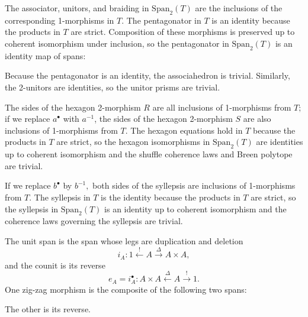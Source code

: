 \documentclass[12pt,twoside,openright]{report}
\newcommand{\Span}{\mbox{Span}}
\begin{document}
The associator, unitors, and braiding in $\Span_2(T)$ are the inclusions of the corresponding 1-morphisms in $T.$  The pentagonator in $T$ is an identity because the products in $T$ are strict.  Composition of these morphisms is preserved up to coherent isomorphism under inclusion, so the pentagonator in $\Span_2(T)$ is an identity map of spans:
\begin{center}
\end{center}
Because the pentagonator is an identity, the associahedron is trivial.  Similarly, the 2-unitors are identities, so the unitor prisms are trivial.

The sides of the hexagon 2-morphism $R$ are all inclusions of 1-morphisms from $T;$ if we replace $a^{\bullet}$ with $a^{-1}$, the sides of the hexagon 2-morphism $S$ are also inclusions of 1-morphisms from $T.$  The hexagon equations hold in $T$ because the products in $T$ are strict, so the hexagon isomorphisms in $\Span_2(T)$ are identities up to coherent isomorphism and the shuffle coherence laws and Breen polytope are trivial.

If we replace $b^{\bullet}$ by $b^{-1},$ both sides of the syllepsis are inclusions of 1-morphisms from $T.$  The syllepsis in $T$ is the identity because the products in $T$ are strict, so the syllepsis in $\Span_2(T)$ is an identity up to coherent isomorphism and the coherence laws governing the syllepsis are trivial.

The unit span is the span whose legs are duplication and deletion
$$i_A: 1 \stackrel{!}{\leftarrow} A \stackrel{\Delta}{\to} A\times A,$$
and the counit is its reverse
$$e_A = i_A^{\bullet}: A\times A \stackrel{\Delta}{\leftarrow} A \stackrel{!}{\to} 1.$$
One zig-zag morphism is the composite of the following two spans:
\begin{center}
\end{center}
The other is its reverse.
\end{document}
